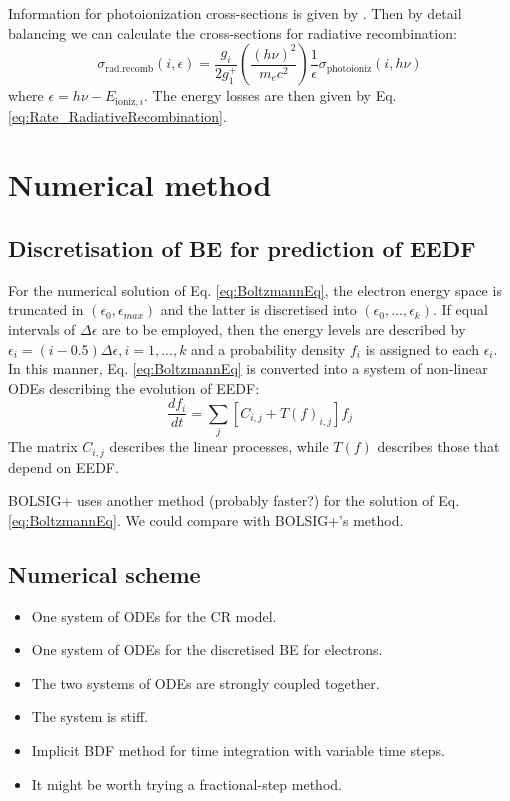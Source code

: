 Information for photoionization cross-sections is given by \cite{kapper2011ionizing}. Then by detail balancing we can calculate the cross-sections for radiative recombination: 
%
\begin{equation}
    \label{eq:cross-section_rad_recomb}
    \sigma_\text{rad.recomb}(i,\epsilon) = \frac{g_i}{2 g_1^+} (\frac{(h \nu)^2}{m_e c^2})\frac{1}{\epsilon} \sigma_\text{photoioniz}(i,h \nu)  
\end{equation}
% 
where $\epsilon = h \nu - E_{\text{ioniz},i}$. The energy losses are then given by Eq. \eqref{eq:Rate_RadiativeRecombination}.


\section{Numerical method} \label{sec:NumericalMethod}

\subsection{Discretisation  of BE for prediction of EEDF}

For the numerical solution of Eq. \eqref{eq:BoltzmannEq}, the electron energy space is truncated in $(\epsilon_0, \epsilon_{max})$ and the latter is discretised  into $(\epsilon_0, ..., \epsilon_k)$. If equal intervals of $\Delta \epsilon$ are to be employed, then the energy levels are described by $\epsilon_i = (i-0.5) \Delta \epsilon, i = 1,...,k$ and a probability density $f_i$ is assigned to each $\epsilon_i$.   In this manner, Eq. \eqref{eq:BoltzmannEq} is converted into a system of non-linear ODEs  describing the evolution of EEDF: 
% 
\begin{equation}
    \label{eq:discretised_EEDF}
    \frac{d f_i}{dt} =  \sum_j [C_{i,j} + T(f)_{i,j}]f_j
\end{equation}
% 
The matrix $C_{i,j}$ describes the linear processes, while $T(f)$ describes those that depend on EEDF. 

BOLSIG+ uses another method (probably faster?) for the solution of Eq. \eqref{eq:BoltzmannEq}. We could compare with BOLSIG+'s method. 

\subsection{Numerical scheme}
\begin{itemize}[noitemsep,topsep=1pt,parsep=1pt,partopsep=3pt]
    \item One system of ODEs for the CR model.
    \item One system of ODEs for the discretised BE for electrons. 
    \item The two systems of ODEs are strongly coupled together.
    \item The system is stiff.
    \item Implicit BDF method for time integration with  variable time steps.
    \item It might be worth trying a fractional-step method. 
\end{itemize}




